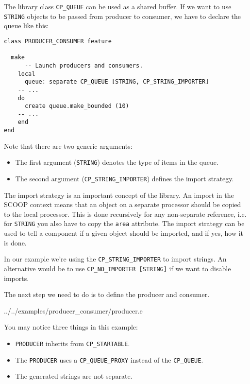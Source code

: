 \documentclass[a4paper,10pt]{report}
\begin{document}
The library class \lstinline!CP_QUEUE! can be used as a shared buffer.
If we want to use \lstinline!STRING! objects to be passed from producer to consumer, we have to declare the queue like this:

\begin{lstlisting}
class PRODUCER_CONSUMER feature

  make
      -- Launch producers and consumers.
    local
      queue: separate CP_QUEUE [STRING, CP_STRING_IMPORTER]
	-- ...
    do
      create queue.make_bounded (10)
	-- ...
    end
end
\end{lstlisting}

Note that there are two generic arguments:
\begin{itemize}
\item The first argument (\lstinline!STRING!) denotes the type of items in the queue.
\item The second argument (\lstinline!CP_STRING_IMPORTER!) defines the import strategy.
\end{itemize}

The import strategy is an important concept of the library.
An import in the SCOOP context means that an object on a separate processor should be copied to the local processor.
This is done recursively for any non-separate reference, i.e. for  \lstinline!STRING! you also have to copy the \lstinline!area! attribute.
The import strategy can be used to tell a component if a given object should be imported, and if yes, how it is done.

In our example we're using the \lstinline!CP_STRING_IMPORTER! to import strings.
An alternative would be to use \lstinline!CP_NO_IMPORTER [STRING]! if we want to disable imports.

The next step we need to do is to define the producer and consumer.

 {../../examples/producer_consumer/producer.e}

You may notice three things in this example:

\begin{itemize}
 \item \lstinline!PRODUCER! inherits from \lstinline!CP_STARTABLE!.
 \item The \lstinline!PRODUCER! uses a \lstinline!CP_QUEUE_PROXY! instead of the \lstinline!CP_QUEUE!.
 \item The generated strings are not separate.
\end{itemize}
\end{document}
